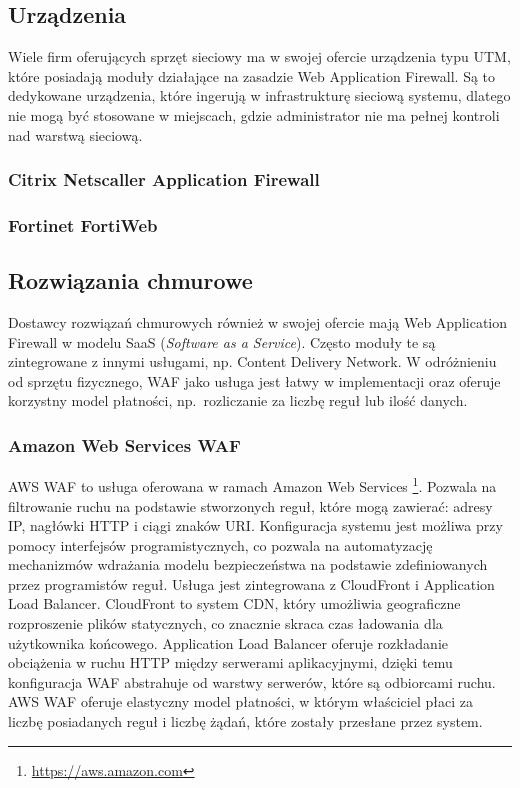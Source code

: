 \documentclass[11pt,a4paper,polish,thesis,oneside]{dcsbook}
\begin{document}
\subsection{Urządzenia}
Wiele firm oferujących sprzęt sieciowy ma w swojej ofercie urządzenia typu UTM, które posiadają moduły działające na zasadzie Web Application Firewall. Są to dedykowane urządzenia, które ingerują w infrastrukturę sieciową systemu, dlatego nie mogą być stosowane w miejscach, gdzie administrator nie ma pełnej kontroli nad warstwą sieciową.
\subsubsection{Citrix Netscaller Application Firewall}
\subsubsection{Fortinet FortiWeb}

\subsection{Rozwiązania chmurowe}
Dostawcy rozwiązań chmurowych również w swojej ofercie mają Web Application Firewall w modelu SaaS (\textit{Software as a Service}). Często moduły te są zintegrowane z innymi usługami, np. Content Delivery Network. W odróżnieniu od sprzętu fizycznego, WAF jako usługa jest łatwy w implementacji oraz oferuje korzystny model płatności, np.~rozliczanie za liczbę reguł lub ilość danych.
\subsubsection{Amazon Web Services WAF}
AWS WAF to usługa oferowana w ramach Amazon Web Services \footnote{\url{https://aws.amazon.com}}. Pozwala na filtrowanie ruchu na podstawie stworzonych reguł, które mogą zawierać: adresy IP, nagłówki HTTP i ciągi znaków URI. Konfiguracja systemu jest możliwa przy pomocy interfejsów programistycznych, co pozwala na automatyzację mechanizmów wdrażania modelu bezpieczeństwa na podstawie zdefiniowanych przez programistów reguł. Usługa jest zintegrowana z CloudFront i Application Load Balancer. CloudFront to system CDN, który umożliwia geograficzne rozproszenie plików statycznych, co znacznie skraca czas ładowania dla użytkownika końcowego. Application Load Balancer oferuje rozkładanie obciążenia w ruchu HTTP między serwerami aplikacyjnymi, dzięki temu konfiguracja WAF abstrahuje od warstwy serwerów, które są odbiorcami ruchu. AWS WAF oferuje elastyczny model płatności, w którym właściciel płaci za liczbę posiadanych reguł i liczbę żądań, które zostały przesłane przez system.
\end{document}
